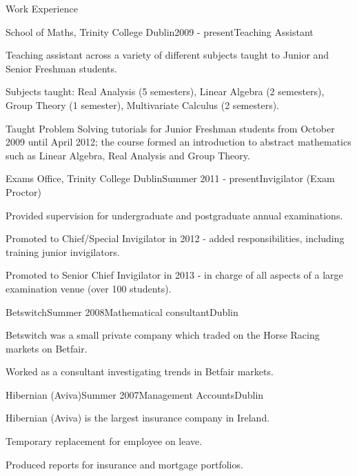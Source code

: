 \documentclass{resume} %
\begin{document}
\begin{rSection}{Work Experience}
\begin{rSubsection}{School of Maths, Trinity College Dublin}{2009 - present}{Teaching Assistant}{}
\item Teaching assistant across a variety of different subjects taught to Junior and Senior Freshman students.
\item Subjects taught: Real Analysis (5 semesters), Linear Algebra (2 semesters), Group Theory (1 semester), Multivariate Calculus (2 semesters).
\item Taught Problem Solving tutorials for Junior Freshman students from October 2009 until April 2012; the course formed an introduction to abstract mathematics such as Linear Algebra, Real Analysis and Group Theory.
\end{rSubsection}

\begin{rSubsection}{Exams Office, Trinity College Dublin}{Summer 2011 - present}{Invigilator (Exam Proctor)}{}
\item Provided supervision for undergraduate and postgraduate annual examinations.
\item Promoted to Chief/Special Invigilator in 2012 - added responsibilities, including training junior invigilators.
\item Promoted to Senior Chief Invigilator in 2013 - in charge of all aspects of a large examination venue (over 100 students).
\end{rSubsection}


\begin{rSubsection}{Betswitch}{Summer 2008}{Mathematical consultant}{Dublin}
\item Betswitch was a small private company which traded on the Horse Racing markets on Betfair.
\item Worked as a consultant investigating trends in Betfair markets.
\end{rSubsection}




\begin{rSubsection}{Hibernian (Aviva)}{Summer 2007}{Management Accounts}{Dublin}
\item Hibernian (Aviva) is the largest insurance company in Ireland.
\item Temporary replacement for employee on leave.
\item Produced reports for insurance and mortgage portfolios.
\end{rSubsection}


\end{rSection}
\end{document}
